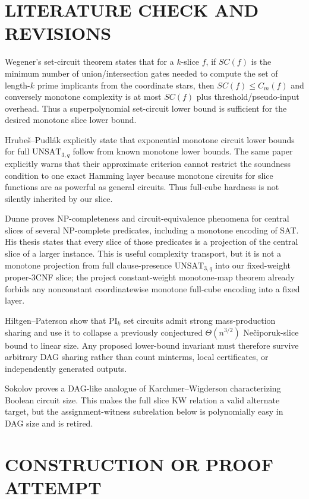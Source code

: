 \documentclass[11pt]{article}
\begin{document}
\section{LITERATURE CHECK AND REVISIONS}
Wegener's set-circuit theorem states that for a $k$-slice $f$, if $SC(f)$ is the minimum number of union/intersection gates needed to compute the set of length-$k$ prime implicants from the coordinate stars, then $SC(f)\le C_m(f)$ and conversely monotone complexity is at most $SC(f)$ plus threshold/pseudo-input overhead. Thus a superpolynomial set-circuit lower bound is sufficient for the desired monotone slice lower bound.

Hrube\v{s}--Pudl\'ak explicitly state that exponential monotone circuit lower bounds for full $\mathrm{UNSAT}_{3,q}$ follow from known monotone lower bounds. The same paper explicitly warns that their approximate criterion cannot restrict the soundness condition to one exact Hamming layer because monotone circuits for slice functions are as powerful as general circuits. Thus full-cube hardness is not silently inherited by our slice.

Dunne proves NP-completeness and circuit-equivalence phenomena for central slices of several NP-complete predicates, including a monotone encoding of SAT. His thesis states that every slice of those predicates is a projection of the central slice of a larger instance. This is useful complexity transport, but it is not a monotone projection from full clause-presence $\mathrm{UNSAT}_{3,q}$ into our fixed-weight proper-3CNF slice; the project constant-weight monotone-map theorem already forbids any nonconstant coordinatewise monotone full-cube encoding into a fixed layer.

Hiltgen--Paterson show that PI$_k$ set circuits admit strong mass-production sharing and use it to collapse a previously conjectured $\Theta(n^{3/2})$ Ne\v{c}iporuk-slice bound to linear size. Any proposed lower-bound invariant must therefore survive arbitrary DAG sharing rather than count minterms, local certificates, or independently generated outputs.

Sokolov proves a DAG-like analogue of Karchmer--Wigderson characterizing Boolean circuit size. This makes the full slice KW relation a valid alternate target, but the assignment-witness subrelation below is polynomially easy in DAG size and is retired.

\section{CONSTRUCTION OR PROOF ATTEMPT}
\end{document}
